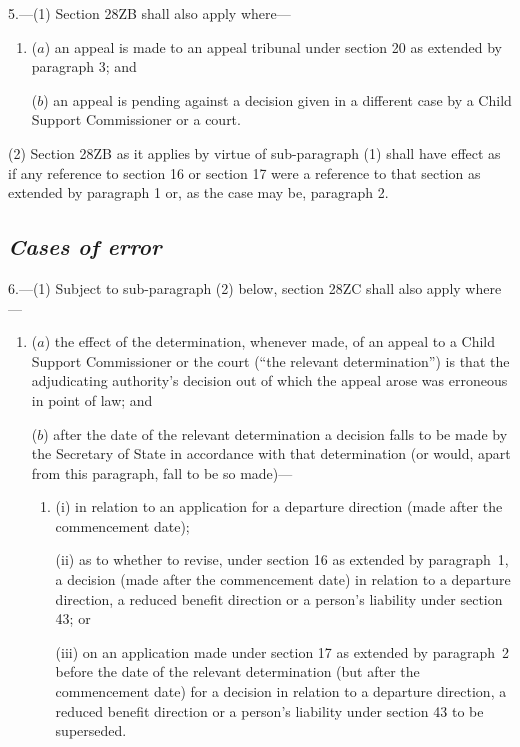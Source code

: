 \documentclass[12pt,a4paper]{article}
\begin{document}
\medskip

5.---(1) Section 28ZB shall also apply where—
\begin{enumerate}\item[]
($a$) an appeal is made to an appeal tribunal under section 20 as extended by paragraph 3; and

($b$) an appeal is pending against a decision given in a different case by a Child Support Commissioner or a court.
\end{enumerate}

(2) Section 28ZB as it applies by virtue of sub-paragraph (1) shall have effect as if any reference to section 16 or section 17 were a reference to that section as extended by paragraph 1 or, as the case may be, paragraph 2.

\subsection*{\itshape Cases of error}

6.---(1) Subject to sub-paragraph (2) below, section 28ZC shall also apply where—
\begin{enumerate}\item[]
($a$) the effect of the determination, whenever made, of an appeal to a Child Support Commissioner or the court (“the relevant determination”) is that the adjudicating authority’s decision out of which the appeal arose was erroneous in point of law; and

($b$) after the date of the relevant determination a decision falls to be made by the Secretary of State in accordance with that determination (or would, apart from this paragraph, fall to be so made)—
\begin{enumerate}\item[]
(i) in relation to an application for a departure direction (made after the commencement date);

(ii) as to whether to revise, under section 16 as extended by paragraph~1, a decision (made after the commencement date) in relation to a departure direction, a reduced benefit direction or a person’s liability under section 43; or

(iii) on an application made under section 17 as extended by paragraph~2 before the date of the relevant determination (but after the commencement date) for a decision in relation to a departure direction, a reduced benefit direction or a person’s liability under section 43 to be superseded.
\end{enumerate}
\end{enumerate}
\end{document}
